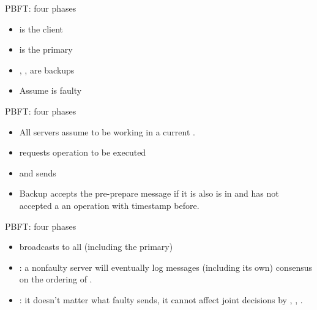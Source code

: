 \begin{slide}{PBFT: four phases}
  \begin{centerfig}
  \end{centerfig}
  \begin{itemize}\tightlist
  \item {} is the client
  \item {} is the primary
  \item {}, ,  are backups
  \item Assume  is faulty
  \end{itemize}
\end{slide}
\begin{slide}{PBFT: four phases}
  \begin{centerfig}
  \end{centerfig}
  \begin{itemize}\tightlist
  \item All servers assume to be working in a current  .
  \item {} requests operation  to be executed
  \item {}   and sends 
  \item Backup  accepts the pre-prepare message if it is also is in  and has not accepted a
    an operation with timestamp  before.
  \end{itemize}
\end{slide}
\begin{slide}{PBFT: four phases}
  \begin{centerfig}
  \end{centerfig}
  \begin{itemize}\tightlist
  \item {} broadcasts  to all (including the primary)
  \item {}: a nonfaulty server will eventually log  messages
     (including its own) \mathexpr{\Rightarrow} consensus on the ordering
    of .
  \item {}: it doesn't matter what faulty  sends, it cannot affect joint decisions by ,
    , .
  \end{itemize}
\end{slide}
